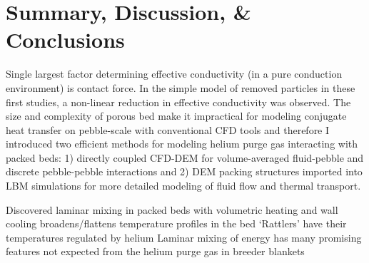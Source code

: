 \section{Summary, Discussion, \& Conclusions}
Single largest factor determining effective conductivity (in a pure conduction environment) is contact force. In the simple model of removed particles in these first studies, a non-linear reduction in effective conductivity was observed. The size and complexity of porous bed make it impractical for modeling conjugate heat transfer on pebble-scale with conventional CFD tools and therefore I introduced two efficient methods for modeling helium purge gas interacting with packed beds: 1) directly coupled CFD-DEM for volume-averaged fluid-pebble and discrete pebble-pebble interactions and 2) DEM packing structures imported into LBM simulations for more detailed modeling of fluid flow and thermal transport.

Discovered laminar mixing in packed beds with volumetric heating and wall cooling broadens/flattens temperature profiles in the bed 
‘Rattlers’ have their temperatures regulated by helium
Laminar mixing of energy has many promising features not expected from the helium purge gas in breeder blankets

